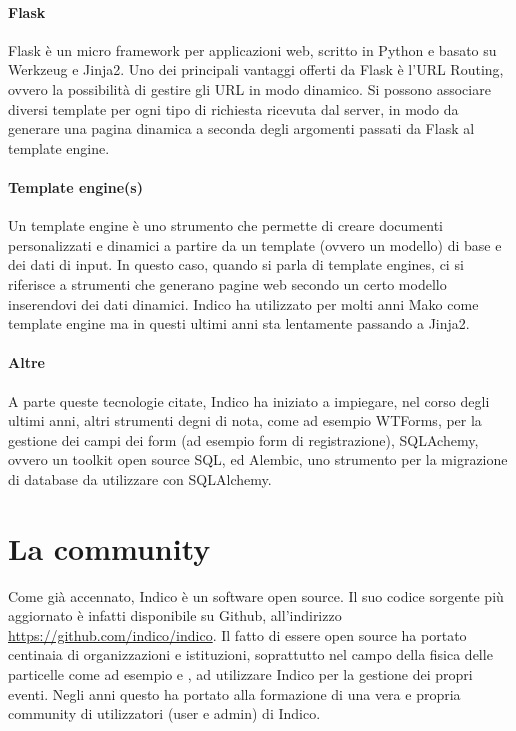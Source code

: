 		\paragraph{Flask}Flask è un micro framework per applicazioni web, scritto in Python e basato su Werkzeug e Jinja2. Uno dei principali vantaggi offerti da Flask è l'URL Routing, ovvero la  possibilità di gestire gli URL in modo dinamico. Si possono associare diversi template per ogni tipo di richiesta ricevuta dal server, in modo da generare una pagina dinamica a seconda degli argomenti passati da Flask al template engine. \cite{indico:flask}
		
		\paragraph{Template engine(s)}Un template engine è uno strumento che permette di creare documenti personalizzati e dinamici a partire da un template (ovvero un modello) di base e dei dati di input. In questo caso, quando si parla di template engines, ci si riferisce a strumenti che generano pagine web secondo un certo modello inserendovi dei dati dinamici. Indico ha utilizzato per molti anni Mako come template engine ma in questi ultimi anni sta lentamente passando a Jinja2. \cite{indico:template_engines}
		
		\paragraph{Altre}A parte queste tecnologie citate, Indico ha iniziato a impiegare, nel corso degli ultimi anni, altri strumenti degni di nota, come  ad esempio WTForms, per la gestione dei campi dei form (ad esempio form di registrazione), SQLAchemy, ovvero un toolkit open source SQL, ed Alembic, uno strumento per la migrazione di database da utilizzare con SQLAlchemy.
		
	\section{La community} \label{sec:i;community}
	
		Come già accennato,  Indico è un software open source. Il suo codice sorgente più aggiornato è infatti disponibile su Github, all'indirizzo \url{https://github.com/indico/indico}. Il fatto di essere open source ha portato centinaia di organizzazioni e istituzioni, soprattutto nel campo della fisica delle particelle come ad esempio  e , ad utilizzare Indico per la gestione dei propri eventi. Negli anni questo ha portato alla formazione di una vera e propria community di utilizzatori (user e admin) di Indico.
		
